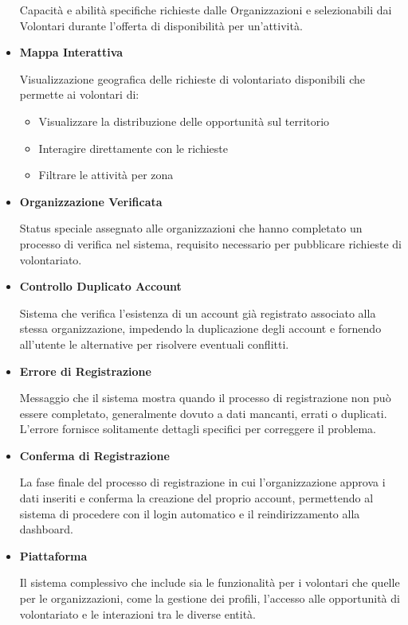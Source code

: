 \begin{itemize}
Capacità e abilità specifiche richieste dalle Organizzazioni e selezionabili dai Volontari durante l'offerta di disponibilità per un'attività.

\item \textbf{Mappa Interattiva}

Visualizzazione geografica delle richieste di volontariato disponibili che permette ai volontari di:
\begin{itemize}
    \item Visualizzare la distribuzione delle opportunità sul territorio
    \item Interagire direttamente con le richieste
    \item Filtrare le attività per zona
\end{itemize}

\item \textbf{Organizzazione Verificata}

Status speciale assegnato alle organizzazioni che hanno completato un processo di verifica nel sistema, requisito necessario per pubblicare richieste di volontariato.

\item \textbf{Controllo Duplicato Account}

Sistema che verifica l'esistenza di un account già registrato associato alla stessa organizzazione, impedendo la duplicazione degli account e fornendo all'utente le alternative per risolvere eventuali conflitti.

\item \textbf{Errore di Registrazione}

Messaggio che il sistema mostra quando il processo di registrazione non può essere completato, generalmente dovuto a dati mancanti, errati o duplicati. L'errore fornisce solitamente dettagli specifici per correggere il problema.

\item \textbf{Conferma di Registrazione}

La fase finale del processo di registrazione in cui l'organizzazione approva i dati inseriti e conferma la creazione del proprio account, permettendo al sistema di procedere con il login automatico e il reindirizzamento alla dashboard.

\item \textbf{Piattaforma}

Il sistema complessivo che include sia le funzionalità per i volontari che quelle per le organizzazioni, come la gestione dei profili, l'accesso alle opportunità di volontariato e le interazioni tra le diverse entità.

\end{itemize}